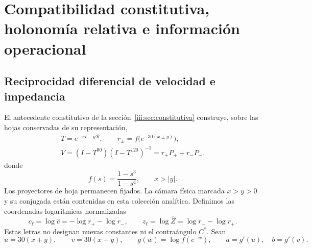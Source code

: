 \section{Compatibilidad constitutiva, holonomía relativa e información operacional}
\label{md:comp:capitulo}

\subsection{Reciprocidad diferencial de velocidad e impedancia}
\label{md:comp:reciprocidad}

El antecedente constitutivo de la sección~\ref{iii:sec:constitutiva} construye, sobre las hojas
conservadas de su representación,
\begin{equation}
 \begin{gathered}
 T=e^{-xI-y\mathcal R},\qquad
 r_\pm=f\bigl(e^{-30(x\pm y)}\bigr),\\
 V=(I-T^{90})(I-T^{120})^{-1}=r_+P_++r_-P_-.
 \end{gathered}
 \label{md:comp:constitutiva}
\end{equation}
donde
\[
 f(s)=\frac{1-s^3}{1-s^4},\qquad x>|y|.
\]
Los proyectores de hoja permanecen fijados. La cámara física marcada
\(x>y>0\) y su conjugada están contenidas en esta colección analítica.
Definimos las coordenadas logarítmicas normalizadas
\begin{equation}
 c_\ell=\log\widehat c=-\log r_+-\log r_-,\qquad
 z_\ell=\log\widehat Z=\log r_--\log r_+.
 \label{md:comp:logaritmos}
\end{equation}
Estas letras no designan nuevas constantes ni el contraángulo \(C^*\).
Sean
\[
 u=30(x+y),\qquad v=30(x-y),\qquad
 g(w)=\log f(e^{-w}),\qquad a=g'(u),\quad b=g'(v).
\]

